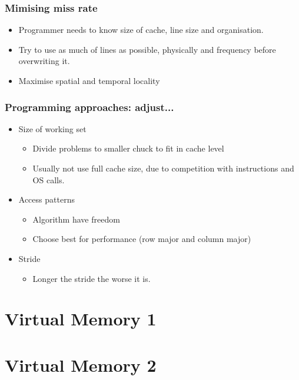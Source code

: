 \documentclass{article}
\begin{document}
		\subsubsection{Mimising miss rate}
			\begin{itemize}
				\item Programmer needs to know size of cache, line size and organisation.
				\item Try to use as much of lines as possible, physically and frequency before overwriting it.
				\item Maximise spatial and temporal locality
			\end{itemize}

		\subsubsection{Programming approaches: adjust...}
			\begin{itemize}
				\item Size of working set
				\begin{itemize}
					\item Divide problems to smaller chuck to fit in cache level
					\item Usually not use full cache size, due to competition with instructions and OS calls.
				\end{itemize}

				\item Access patterns
				\begin{itemize}
					\item Algorithm have freedom
					\item Choose best for performance (row major and column major)
				\end{itemize}

				\item Stride
				\begin{itemize}
					\item Longer the stride the worse it is.
				\end{itemize}
			\end{itemize}

\section{Virtual Memory 1}

\section{Virtual Memory 2}
\end{document}
